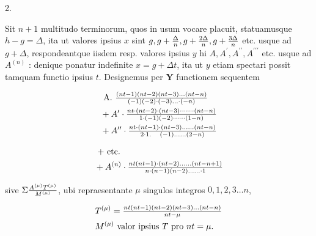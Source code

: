 \documentclass[twoside,12pt, showframe]{memoir}
\let\oldfrac\frac
\def\frac#1#2{\mathchoice{\tfrac{#1}{#2}}{\oldfrac{#1}{#2}}{\genfrac{}{}{}{2}{#1}{#2\mathstrut}}{\genfrac{}{}{}{3}{#1}{#2\mathstrut}}}
\begin{document}
2.

Sit \(n+1\) multitudo terminorum, quos in usum vocare placuit, statuamusque \(h-g=\Delta\), ita ut valores ipsius \(x\) sint \(g, g+\frac{\Delta}{n}, g+\frac{2 \Delta}{n}, g+\frac{3 \Delta}{n}\) etc. usque ad \(g+\Delta\), respondeantque iisdem resp. valores ipsius \(y\) hi \(A, A^{\prime}, A^{\prime \prime}, A^{\prime \prime \prime}\) etc. usque ad \(A^{(n)}\) : denique ponatur indefinite \(x=g+\Delta t\), ita ut \(y\) etiam spectari possit tamquam functio ipsius \(t\). Designemus per \(\boldsymbol{Y}\) functionem sequentem

\[
\begin{aligned}
& \text { A. } \frac{(n t-1)(n t-2)(n t-3) \ldots(n t-n)}{(-1)(-2) \cdot(-3) \ldots \cdot(-n)} \\
& +A^{\prime} \cdot \frac{n t \cdot(n t-2) \cdot(n t-3) \cdots \cdots \cdot(n t-n)}{1 \cdot(-1)(-2) \cdots \cdots(1-n)} \\
& +A^{\prime \prime} \cdot \frac{n t \cdot(n t-1) \cdot(n t-3) \ldots \ldots(n t-n)}{2 \cdot 1 . \quad(-1) \ldots \ldots(2-n)}
\end{aligned}
\]

\begin{center}
\end{center}

\[
\begin{aligned}
& \text { + etc. } \\
& +A^{(n)} \cdot \frac{n t(n t-1) \cdot(n t-2) \ldots \ldots(n t-n+1)}{n \cdot(n-1)(n-2) \ldots \ldots \cdot 1}
\end{aligned}
\]

sive \(\Sigma \frac{A^{(\mu)} T^{(\mu)}}{M^{(\mu)}}\), ubi repraesentante \(\mu\) singulos integros \(0,1,2,3 \ldots n\),

\[
\begin{aligned}
& T^{(\mu)}=\frac{n t(n t-1)(n t-2)(n t-3) \ldots(n t-n)}{n t-\mu} \\
& M^{(\mu)} \text { valor ipsius } T \text { pro } n t=\mu .
\end{aligned}
\]
\end{document}
